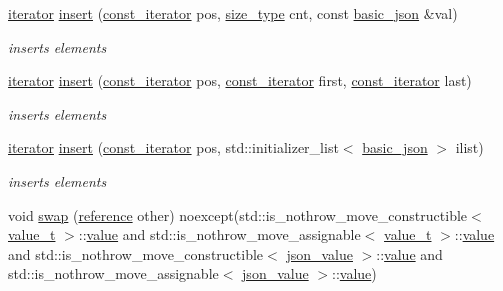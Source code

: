 \begin{DoxyCompactItemize}
\hyperlink{classnlohmann_1_1basic__json_1_1iterator}{iterator} \hyperlink{classnlohmann_1_1basic__json_a624025acfcf64364d98424402b837bc6}{insert} (\hyperlink{classnlohmann_1_1basic__json_1_1const__iterator}{const\+\_\+iterator} pos, \hyperlink{classnlohmann_1_1basic__json_a1579a8f72a230358d6cd1a6e8a62859b}{size\+\_\+type} cnt, const \hyperlink{classnlohmann_1_1basic__json}{basic\+\_\+json} \&val)
\begin{DoxyCompactList}\small\item\em inserts elements \end{DoxyCompactList}\item 
\hyperlink{classnlohmann_1_1basic__json_1_1iterator}{iterator} \hyperlink{classnlohmann_1_1basic__json_aeaa0644fd6b99af364e772092268dfd6}{insert} (\hyperlink{classnlohmann_1_1basic__json_1_1const__iterator}{const\+\_\+iterator} pos, \hyperlink{classnlohmann_1_1basic__json_1_1const__iterator}{const\+\_\+iterator} first, \hyperlink{classnlohmann_1_1basic__json_1_1const__iterator}{const\+\_\+iterator} last)
\begin{DoxyCompactList}\small\item\em inserts elements \end{DoxyCompactList}\item 
\hyperlink{classnlohmann_1_1basic__json_1_1iterator}{iterator} \hyperlink{classnlohmann_1_1basic__json_aadb4e5be88221e5e28cdb752332f3d13}{insert} (\hyperlink{classnlohmann_1_1basic__json_1_1const__iterator}{const\+\_\+iterator} pos, std\+::initializer\+\_\+list$<$ \hyperlink{classnlohmann_1_1basic__json}{basic\+\_\+json} $>$ ilist)
\begin{DoxyCompactList}\small\item\em inserts elements \end{DoxyCompactList}\item 
void \hyperlink{classnlohmann_1_1basic__json_a2f774129440c427253dc97406e2d9010}{swap} (\hyperlink{classnlohmann_1_1basic__json_a3ec8e17be8732fe436e9d6733f52b7a3}{reference} other) noexcept(std\+::is\+\_\+nothrow\+\_\+move\+\_\+constructible$<$ \hyperlink{classnlohmann_1_1basic__json_a231b02148577b69a154b2ce2c87a5522}{value\+\_\+t} $>$\+::\hyperlink{classnlohmann_1_1basic__json_a407e73a037e6e3067ef7aa2c25a79f39}{value} and std\+::is\+\_\+nothrow\+\_\+move\+\_\+assignable$<$ \hyperlink{classnlohmann_1_1basic__json_a231b02148577b69a154b2ce2c87a5522}{value\+\_\+t} $>$\+::\hyperlink{classnlohmann_1_1basic__json_a407e73a037e6e3067ef7aa2c25a79f39}{value} and std\+::is\+\_\+nothrow\+\_\+move\+\_\+constructible$<$ \hyperlink{unionnlohmann_1_1basic__json_1_1json__value}{json\+\_\+value} $>$\+::\hyperlink{classnlohmann_1_1basic__json_a407e73a037e6e3067ef7aa2c25a79f39}{value} and std\+::is\+\_\+nothrow\+\_\+move\+\_\+assignable$<$ \hyperlink{unionnlohmann_1_1basic__json_1_1json__value}{json\+\_\+value} $>$\+::\hyperlink{classnlohmann_1_1basic__json_a407e73a037e6e3067ef7aa2c25a79f39}{value})

\end{DoxyCompactItemize}
